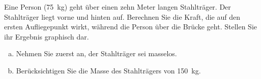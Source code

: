\begin{aufgabe}
	Eine Person (\SI{75}{kg}) geht über einen zehn Meter langen Stahlträger. Der Stahlträger liegt vorne und hinten auf.
Berechnen Sie die Kraft, die auf den ersten Aufliegepunkt wirkt, während die Person über die Brücke geht.
Stellen Sie ihr Ergebnis graphisch dar.
\begin{enumerate} [a)]
	\item Nehmen Sie zuerst an, der Stahlträger sei masselos.
	\item Berücksichtigen Sie die Masse des Stahlträgers von \SI{150}{kg}.
\end{enumerate}
\end{aufgabe}
\begin{loesung}

\end{loesung}
